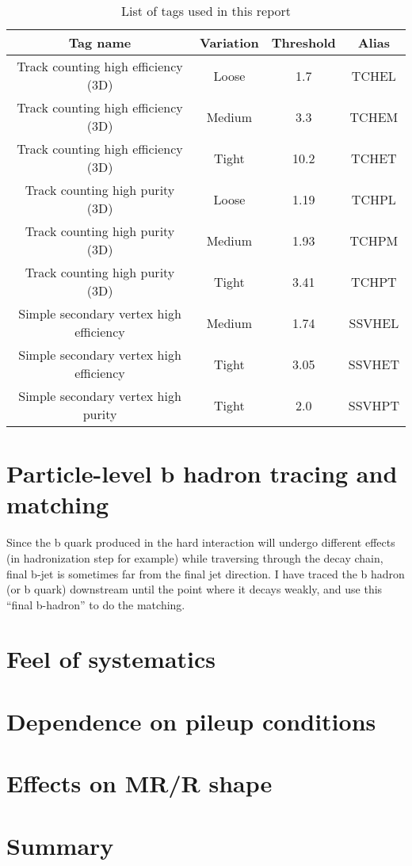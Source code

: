 \documentclass{fheadnote}
\begin{document}
\begin{table}[htbp]
   \centering
   \begin{tabular}{|c|c|c|c|}
   \hline
   Tag name & Variation & Threshold & Alias \\\hline
   Track counting high efficiency (3D) & Loose & 1.7 & TCHEL \\\hline
   Track counting high efficiency (3D) & Medium & 3.3 & TCHEM \\\hline
   Track counting high efficiency (3D) & Tight & 10.2 & TCHET \\\hline
   Track counting high purity (3D) & Loose & 1.19 & TCHPL \\\hline
   Track counting high purity (3D) & Medium & 1.93 & TCHPM \\\hline
   Track counting high purity (3D) & Tight & 3.41 & TCHPT \\\hline
   Simple secondary vertex high efficiency & Medium & 1.74 & SSVHEL \\\hline
   Simple secondary vertex high efficiency & Tight & 3.05 & SSVHET \\\hline
   Simple secondary vertex high purity & Tight & 2.0 & SSVHPT \\\hline
   \end{tabular}
   \caption{List of tags used in this report}
   \label{Table_BTagList}
\end{table}

\section{Particle-level b hadron tracing and matching}

Since the b quark produced in the hard interaction will undergo different effects (in hadronization step for example) while traversing through the decay chain, final b-jet is sometimes far from the final jet direction.
I have traced the b hadron (or b quark) downstream until the point where it decays weakly, and use this ``final b-hadron'' to do the matching.



\section{Feel of systematics}

\section{Dependence on pileup conditions}

\section{Effects on MR/R shape}

\section{Summary}

 
\pagebreak
\end{document}
